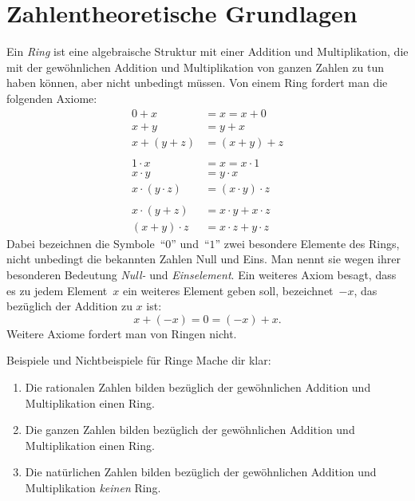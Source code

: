 \documentclass{zirkelblatt}
\newcommand{\head}[1]{\section*{\rmfamily #1}}%
\begin{document}


\head{Zahlentheoretische Grundlagen}

Ein \emph{Ring} ist eine algebraische Struktur mit einer Addition und
Multiplikation, die mit der gewöhnlichen Addition und Multiplikation von ganzen
Zahlen zu tun haben können, aber nicht unbedingt müssen. Von einem Ring fordert
man die folgenden Axiome:
\begin{align*}
    0 + x &= x = x + 0 \\
    x + y &= y + x \\
    x + (y + z) &= (x + y) + z \\\\
    1 \cdot x &= x = x \cdot 1 \\
    x \cdot y &= y \cdot x \\
    x \cdot (y \cdot z) &= (x \cdot y) \cdot z \\\\
    x \cdot (y + z) &= x \cdot y + x \cdot z \\
    (x + y) \cdot z &= x \cdot z + y \cdot z
\end{align*}
Dabei bezeichnen die Symbole~"`$0$"' und~"`$1$"' zwei besondere Elemente des
Rings, nicht unbedingt die bekannten Zahlen Null und Eins. Man nennt sie wegen
ihrer besonderen Bedeutung \emph{Null-} und \emph{Einselement}. Ein weiteres
Axiom besagt, dass es zu jedem Element~$x$ ein weiteres Element geben soll,
bezeichnet~$-x$, das bezüglich der Addition zu $x$ ist:
\[ x + (-x) = 0 = (-x) + x. \]
Weitere Axiome fordert man von Ringen nicht.

\begin{aufgabe}{Beispiele und Nichtbeispiele für Ringe}
Mache dir klar:
\begin{enumerate}
\item Die rationalen Zahlen bilden bezüglich der gewöhnlichen
Addition und Multiplikation einen Ring.
\item Die ganzen Zahlen bilden bezüglich der gewöhnlichen
Addition und Multiplikation einen Ring.
\item Die natürlichen Zahlen bilden bezüglich der gewöhnlichen Addition und
Multiplikation \emph{keinen} Ring.
\end{enumerate}
\end{aufgabe}
\end{document}
